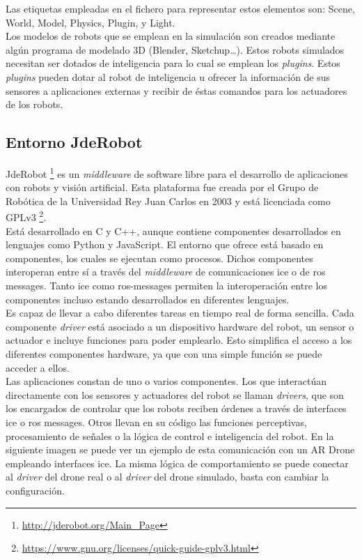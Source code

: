 Las etiquetas empleadas en el fichero para representar estos elementos son: Scene, World, Model, Physics, Plugin, y Light.\\

Los modelos de robots que se emplean en la simulación son creados mediante algún programa de modelado 3D (Blender, Sketchup…). Estos robots simulados necesitan ser dotados de inteligencia para lo cual se emplean los \textit{plugins}. Estos \textit{plugins} pueden dotar al robot de inteligencia u ofrecer la información de sus sensores a aplicaciones externas y recibir de éstas comandos para los actuadores de los robots.


\subsection{Entorno JdeRobot}

JdeRobot \footnote{\url{http://jderobot.org/Main_Page}} es un \textit{middleware} de software libre para el desarrollo de aplicaciones con robots y visión artificial. Esta plataforma fue creada por el Grupo de Robótica de la Universidad Rey Juan Carlos en 2003 y está licenciada como GPLv3 \footnote{\url{https://www.gnu.org/licenses/quick-guide-gplv3.html}}.\\

Está desarrollado en C y C++, aunque contiene componentes desarrollados en lenguajes como Python y JavaScript. El entorno que ofrece está basado en componentes, los cuales se ejecutan como procesos. Dichos componentes interoperan entre sí a través del \textit{middleware} de comunicaciones \acrshort{ice} o de \acrshort{ros} messages. Tanto \acrshort{ice} como \acrshort{ros}-messages permiten la interoperación entre los componentes incluso estando desarrollados en diferentes lenguajes.\\

Es capaz de llevar a cabo diferentes tareas en tiempo real de forma sencilla. Cada componente \textit{driver} está asociado a un dispositivo hardware del robot, un sensor o actuador e incluye funciones para poder emplearlo. Esto simplifica el acceso a los diferentes componentes hardware, ya que con una simple función se puede acceder a ellos.\\

Las aplicaciones constan de uno o varios componentes. Los que interactúan directamente con los sensores y actuadores del robot se llaman \textit{drivers}, que son los encargados de controlar que los robots reciben órdenes a través de interfaces \acrshort{ice} o \acrshort{ros} messages. Otros llevan en su código las funciones perceptivas, procesamiento de señales o la lógica de control e inteligencia del robot. En la siguiente imagen se puede ver un ejemplo de esta comunicación con un AR Drone empleando interfaces \acrshort{ice}. La misma lógica de comportamiento se puede conectar al \textit{driver} del drone real o al \textit{driver} del drone simulado, basta con cambiar la configuración.\\

